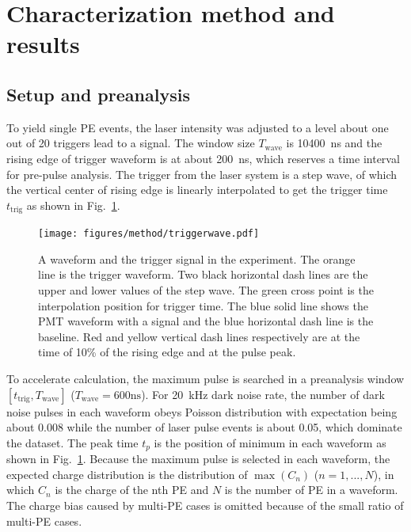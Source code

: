 \section{Characterization method and results}
\label{Method}
\subsection{Setup and preanalysis}
\label{sec:laserstage}

To yield single PE events, the laser intensity was adjusted to a level about one out of 20 triggers lead to a signal. The window size $T_{\mathrm{wave}}$ is \SI{10400}{ns} and the rising edge of trigger waveform is at about \SI{200}{ns}, which reserves a time interval for pre-pulse analysis. The trigger from the laser system is a step wave, of which the vertical center of rising edge is linearly interpolated to get the trigger time $t_{\mathrm{trig}}$ as shown in Fig.~\ref{fig:triggertime}.
\begin{figure}[!htbp]
    \centering
    \texttt{[image: figures/method/triggerwave.pdf]}
    \caption{A waveform and the trigger signal in the experiment. The orange line is the trigger waveform. Two black horizontal dash lines are the upper and lower values of the step wave. The green cross point is the interpolation position for trigger time. The blue solid line shows the PMT waveform with a signal and the blue horizontal dash line is the baseline. Red and yellow vertical dash lines respectively are at the time of 10\% of the rising edge and at the pulse peak.}
    \label{fig:triggertime}
\end{figure}

To accelerate calculation, the maximum pulse is searched in a preanalysis window $[t_{\mathrm{trig}},T_{\mathrm{wave}}]$ ($T_{\mathrm{wave}}=600\mathrm{ns}$). For \SI{20}{kHz} dark noise rate, the number of dark noise pulses in each waveform obeys Poisson distribution with expectation being about 0.008 while the number of laser pulse events is about 0.05, which dominate the dataset. The peak time $t_p$ is the position of minimum in each waveform as shown in Fig.~\ref{fig:triggertime}. Because the maximum pulse is selected in each waveform, the expected charge distribution is the distribution of $\max(C_n)$ ($n=1,...,N$), in which $C_n$ is the charge of the nth PE and $N$ is the number of PE in a waveform. The charge bias caused by multi-PE cases is omitted because of the small ratio of multi-PE cases.

